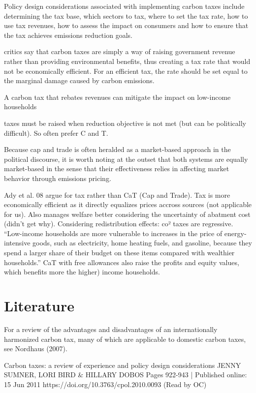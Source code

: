 \documentclass[version=3.21, pagesize, twoside=off, bibliography=totoc, DIV=calc, fontsize=12pt, a4paper]{scrartcl}
\begin{document}
Policy design considerations associated with implementing carbon taxes
include determining the tax base, which sectors to tax, where to set the tax rate, how to use tax
revenues, how to assess the impact on consumers and how to ensure that the tax achieves emissions
reduction goals.

critics say that carbon taxes are simply a way of raising government
revenue rather than providing environmental benefits, thus creating a tax rate that would not be economically efficient. For an efficient tax, the rate should be set equal to the marginal damage caused by
carbon emissions.

A carbon tax that rebates revenues can mitigate the impact on low-income households

taxes must be raised when reduction objective is not met (but can be politically difficult). So often prefer C and T.

Because cap and trade is often heralded as a market-based approach in the
political discourse, it is worth noting at the outset that both systems are equally market-based in
the sense that their effectiveness relies in affecting market behavior through emissions pricing.

Ady et al. 08 argue for tax rather than CaT (Cap and Trade). Tax is more economically efficient as it directly equalizes prices accross sources (not applicable for us). Also manages welfare better considering the uncertainty of abatment cost (didn’t get why). Considering redistribution effects: co² taxes are regressive. “Low-income households are more vulnerable to increases in the price of energy-intensive
goods, such as electricity, home heating fuels, and gasoline, because they spend a larger share of
their budget on these items compared with wealthier households.” CaT with free allowances also raise the profits and equity values, which benefits more the higher) income households.

\section{Literature}
For a review of
the advantages and disadvantages of an internationally harmonized carbon tax, many of which are
applicable to domestic carbon taxes, see Nordhaus (2007).

Carbon taxes: a review of experience and policy design considerations JENNY SUMNER, LORI BIRD \& HILLARY DOBOS Pages 922-943 | Published online: 15 Jun 2011 https://doi.org/10.3763/cpol.2010.0093 (Read by OC)
\end{document}
